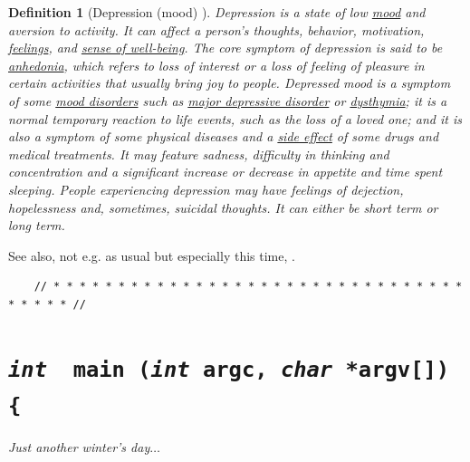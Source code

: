 \documentclass[12pt]{article}
\numberwithin{equation}{section}
\newtheorem{definition}{Definition}[section]
\begin{document}
\begin{definition}[Depression (mood) \cite{Wikipedia/Depression (mood)}]
    \emph{Depression} is a state of low \href{https://en.wikipedia.org/wiki/Mood_(psychology)}{mood} and aversion to activity. It can affect a person's thoughts, behavior, motivation, \href{https://en.wikipedia.org/wiki/Feeling}{feelings}, and \href{https://en.wikipedia.org/wiki/Subjective_well-being}{sense of well-being}. The core symptom of depression is said to be \href{https://en.wikipedia.org/wiki/Anhedonia}{anhedonia}, which refers to loss of interest or a loss of feeling of pleasure in certain activities that usually bring joy to people. Depressed mood is a symptom of some \href{https://en.wikipedia.org/wiki/Mood_disorders}{mood disorders} such as \href{https://en.wikipedia.org/wiki/Major_depressive_disorder}{major depressive disorder} or \href{https://en.wikipedia.org/wiki/Dysthymia}{dysthymia}; it is a normal temporary reaction to life events, such as the loss of a loved one; and it is also a symptom of some physical diseases and a \href{https://en.wikipedia.org/wiki/Side_effect}{side effect} of some drugs and medical treatments. It may feature sadness, difficulty in thinking and concentration and a significant increase or decrease in appetite and time spent sleeping. People experiencing depression may have feelings of dejection, hopelessness and, sometimes, suicidal thoughts. It can either be short term or long term. 
\end{definition}
See also, not e.g. as usual but especially this time, \cite{Solomon2015}.

\begin{verbatim}
    // * * * * * * * * * * * * * * * * * * * * * * * * * * * * * * * * * * * * * //
\end{verbatim}

\section{\texttt{{\color{cyan}\textit{int}} {\color{YellowGreen} main} ({\color{cyan}\textit{int}} argc, {\color{cyan}\textit{char}} *argv[]) \{}}

 \textit{Just another winter's day}$\ldots$
\end{document}
